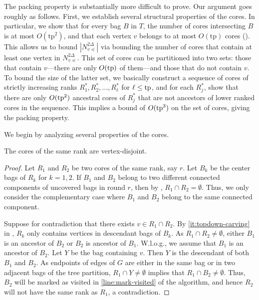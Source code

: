 \documentclass{theoretics}
\newcommand{\tp}{{\rm tp}}
\begin{document}
The packing property is substantially more difficult to prove. Our argument goes roughly as follows. First, we establish several structural properties of the cores. In particular, we show that for every bag $B$ in $T$, the number of cores intersecting $B$ is at most $O(\mathrm{tp}^2)$, and that each vertex $v$ belongs to at most $O(\mathrm{tp})$ cores (). This allows us to bound $\left|N_{v\preceq}^{2\Delta}\right|$ via bounding the number of cores that contain at least one vertex in $N_{v\preceq}^{2\Delta}$. This set of cores can be partitioned into two sets: those that contain $v$---there are only $O(\tp)$ of them---and those that do not contain $v$. To bound the size of the latter set, we basically construct a sequence of cores of strictly increasing ranks $R_1^*, R_2^*, \ldots, R_\ell^*$ for $\ell \leq \tp$, and for each $R_j^*$, show that there are only $O(\tp^2)$ ancestral cores of $R_j^*$ that are not ancestors of lower ranked cores in the sequence. This implies a bound of $O(\tp^3)$ on the set of cores, giving the packing property.

We begin by analyzing several properties of the cores. 

\begin{lemma}  \label{lemma::coresDisjointRank}The cores of the same rank are vertex-disjoint.  
\end{lemma}
\begin{proof}  
 Let $R_1$ and $R_2$ be two cores of the same rank, say $r$. Let $B_k$ be the center bags of $R_k$ for $k=1,2$.  If $B_1$ and $B_2$ belong to two different connected components of uncovered bags in round $r$, then by , $R_1\cap R_2 = \emptyset$. Thus, we only consider the complementary case where $B_1$ and $B_2$ belong to the same connected component.  
	
	Suppose for contradiction that there exists $v\in R_1\cap R_2$. By \cref{it:topdown-carving} in , $R_k$ only contains vertices in descendant bags of $B_k$.  As $R_1\cap R_2 \not=\emptyset$,  either $B_1$ is an ancestor of $B_2$ or $B_2$ is ancestor of $B_1$. W.l.o.g., we assume that $B_1$ is an ancestor of $B_2$. Let $Y$ be the bag containing $v$. Then $Y$ is the descendant of both $B_1$ and $B_2$. As endpoints of edges of $G$ are either in the same bag or in two adjacent bags of the tree partition, $R_1\cap Y \not=\emptyset$ implies that $R_1\cap B_2\not=\emptyset$. Thus, $B_2$ will be marked as visited in \cref{line:mark-visited} of the algorithm, and hence $R_2$ will not have the same rank as $R_1$, a contradiction.  
\end{proof}
\end{document}
